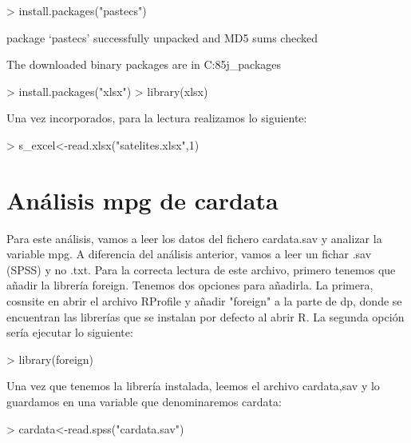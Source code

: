 \documentclass [a4paper] {article}
\begin{document}
\begin{Schunk}
\begin{Sinput}
> install.packages("pastecs")
\end{Sinput}
\begin{Soutput}
package ‘pastecs’ successfully unpacked and MD5 sums checked

The downloaded binary packages are in
	C:\Users\Javier\AppData\Local\Temp\RtmpKes85j\downloaded_packages
\end{Soutput}
\begin{Sinput}
> install.packages("xlsx")
> library(xlsx)
\end{Sinput}
\end{Schunk}

Una vez incorporados, para la lectura realizamos lo siguiente:

\begin{Schunk}
\begin{Sinput}
> s_excel<-read.xlsx("satelites.xlsx",1)
\end{Sinput}
\end{Schunk}


\section{Análisis mpg de cardata}
Para este análisis, vamos a leer los datos del fichero cardata.sav y analizar la variable mpg. A diferencia del
análisis anterior, vamos a leer un fichar .sav (SPSS) y no .txt. Para la correcta lectura de este archivo, primero
tenemos que añadir la librería foreign. Tenemos dos opciones para añadirla. La primera, cosnsite en 
abrir el archivo RProfile y añadir "foreign" a la parte de dp, donde se encuentran
las librerías que se instalan por defecto al abrir R. La segunda opción sería ejecutar lo siguiente:

\begin{Schunk}
\begin{Sinput}
> library(foreign)
\end{Sinput}
\end{Schunk}

Una vez que tenemos la librería instalada, leemos el archivo cardata,sav y lo guardamos en una variable que
denominaremos cardata:

\begin{Schunk}
\begin{Sinput}
> cardata<-read.spss("cardata.sav")
\end{Sinput}
\end{Schunk}
\end{document}
